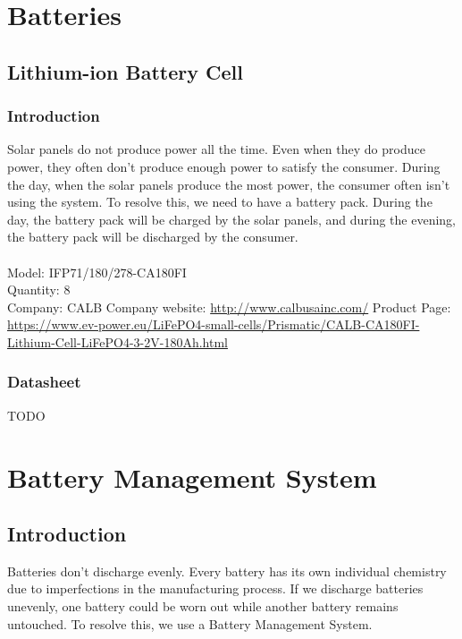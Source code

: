\par

\section{Batteries}

\subsection{Lithium-ion Battery Cell}

\subsubsection{Introduction}

Solar panels do not produce power all the time. Even when they do produce power, they often don’t produce enough power to satisfy the consumer. During the day, when the solar panels produce the most power, the consumer often isn’t using the system. To resolve this, we need to have a battery pack. During the day, the battery pack will be charged by the solar panels, and during the evening, the battery pack will be discharged by the consumer.\\
 \\
Model: IFP71/180/278-CA180FI\\
Quantity: 8\\
Company:  CALB
Company website: \href{http://www.calbusainc.com/}{http://www.calbusainc.com/}
Product Page: \href{https://www.ev-power.eu/LiFePO4-small-cells/Prismatic/CALB-CA180FI-Lithium-Cell-LiFePO4-3-2V-180Ah.html}{ https://www.ev-power.eu/LiFePO4-small-cells/Prismatic/CALB-CA180FI-Lithium-Cell-LiFePO4-3-2V-180Ah.html}

\subsubsection{Datasheet}
TODO

\section{Battery Management System}

\subsection{Introduction}
Batteries don’t discharge evenly. Every battery has its own individual chemistry due to imperfections in the manufacturing process. If we discharge batteries unevenly, one battery could be worn out while another battery remains untouched. To resolve this, we use a Battery Management System.\\

